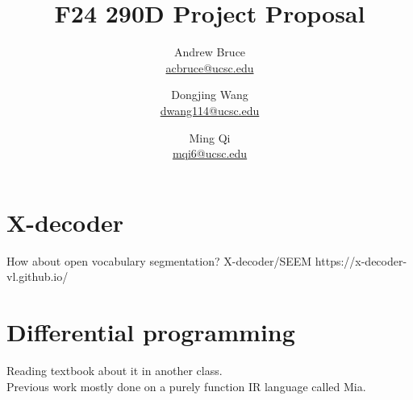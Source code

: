 \documentclass{article}
\title{F24 290D Project Proposal}
\author{Andrew Bruce \\ \href{mailto:acbruce@ucsc.edu}{acbruce@ucsc.edu}
  \and Dongjing Wang \\ \href{mailto:dwang114@ucsc.edu}{dwang114@ucsc.edu}
  \and Ming Qi \\ \href{mailto:mqi6@ucsc.edu}{mqi6@ucsc.edu} }
\begin{document}
\maketitle

\section*{X-decoder}
How about open vocabulary segmentation? X-decoder/SEEM
https://x-decoder-vl.github.io/

\section*{Differential programming}
Reading textbook \cite{DBLP:journals/corr/abs-1907-07587} about it in another class. \\
Previous work \cite{Li:2018:DPI} mostly done on a purely function IR language called Mia.




\end{document}
